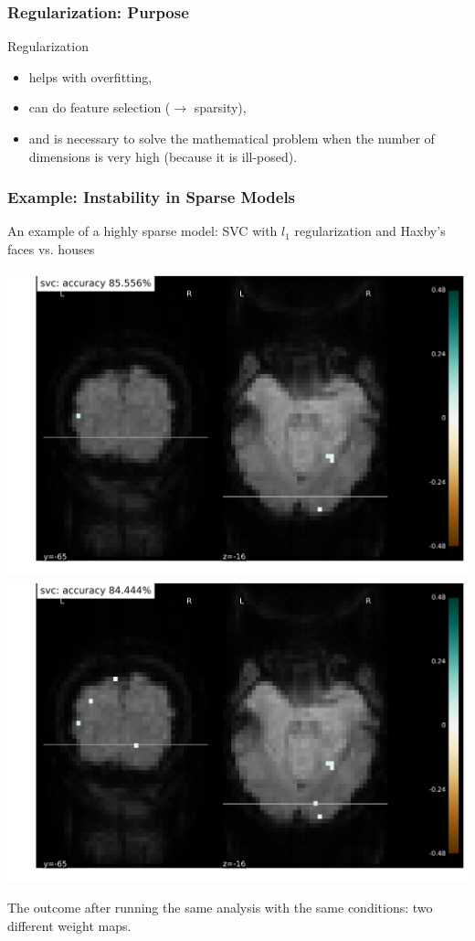 \documentclass[11pt]{beamer}
\begin{document}
\begin{frame}
  \frametitle{Regularization: Purpose}
  Regularization
  \begin{itemize}
  \item helps with overfitting,
  \item can do feature selection ($\rightarrow$ sparsity),
  \item and is necessary to solve the mathematical problem when the number of
    dimensions is very high (because it is ill-posed).
  \end{itemize}

\end{frame}
\begin{frame}
  \frametitle{Example: Instability in Sparse Models}
  An example of a highly sparse model: SVC with $l_1$ regularization and Haxby's
  faces vs. houses
    \begin{center}
      \includegraphics[scale=0.22]{figures/haxby_svc_plotmap_7e41.png}
      \includegraphics[scale=0.22]{figures/haxby_svc_plotmap_b073.png}
    \end{center}
    The outcome after running the same analysis with the same conditions: two
    different weight maps.
\end{frame}
\end{document}
